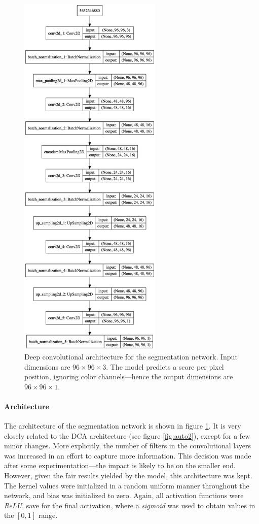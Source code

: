 \begin{figure}[!htbp]
  \begin{center}
    \includegraphics[height=18cm, keepaspectratio]{images/segm_architecture}
    \caption{Deep convolutional architecture for the segmentation network. Input dimensions are $96 \times 96 \times 3$. The model predicts a score per pixel position, ignoring color channels---hence the output dimensions are $96 \times 96 \times 1$.}
    \label{fig:segm_architecture}
  \end{center}
\end{figure}

\paragraph{Architecture} The architecture of the segmentation network is shown in figure \ref{fig:segm_architecture}. It is very closely related to the DCA architecture (see figure \textcolor{blue}{\ref{fig:auto2}}), except for a few minor changes. More explicitly, the number of filters in the convolutional layers was increased in an effort to capture more information. This decision was made after some experimentation---the impact is likely to be on the smaller end. However, given the fair results yielded by the model, this architecture was kept. The kernel values were initialized in a random uniform manner throughout the network, and bias was initialized to zero. Again, all activation functions were \textit{ReLU}, save for the final activation, where a \textit{sigmoid} was used to obtain values in the $[0,1]$ range.

